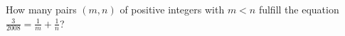 How many pairs $ (m,n)$ of positive integers with $ m < n$ fulfill the equation $ \frac {3}{2008} = \frac 1m + \frac 1n$?